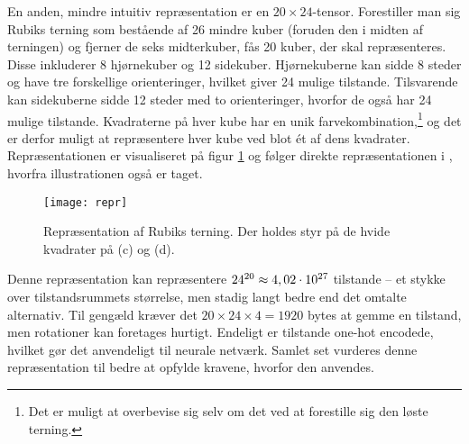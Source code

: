 \documentclass[../main.tex]{subfiles}
\begin{document}
En anden, mindre intuitiv repræsentation er en $ 20\times 24 $-tensor.
Forestiller man sig Rubiks terning som bestående af 26 mindre kuber (foruden den i midten af terningen) og fjerner de seks midterkuber, fås 20 kuber, der skal repræsenteres.
Disse inkluderer 8 hjørnekuber og 12 sidekuber.
Hjørnekuberne kan sidde 8 steder og have tre forskellige orienteringer, hvilket giver 24 mulige tilstande.
Tilsvarende kan sidekuberne sidde 12 steder med to orienteringer, hvorfor de også har 24 mulige tilstande.
Kvadraterne på hver kube har en unik farvekombination,\footnote{Det er muligt at overbevise sig selv om det ved at forestille sig den løste terning.} og det er derfor muligt at repræsentere hver kube ved blot ét af dens kvadrater.
Repræsentationen er visualiseret på figur \ref{fig:kuberepr} og følger direkte repræsentationen i \cite{HumansBeGone}, hvorfra illustrationen også er taget.
\begin{figure}
	\centering
	\texttt{[image: repr]}
	\caption{Repræsentation af Rubiks terning. Der holdes styr på de hvide kvadrater på (c) og (d). \cite{HumansBeGone}}\label{fig:kuberepr}
\end{figure}
Denne repræsentation kan repræsentere $ 24^{20}\approx 4,02\cdot10^{27} $ tilstande -- et stykke over tilstandsrummets størrelse, men stadig langt bedre end det omtalte alternativ.
Til gengæld kræver det $ 20\times 24\times 4=1920 $ bytes at gemme en tilstand, men rotationer kan foretages hurtigt.
Endeligt er tilstande one-hot encodede, hvilket gør det anvendeligt til neurale netværk.
Samlet set vurderes denne repræsentation til bedre at opfylde kravene, hvorfor den anvendes.
\end{document}
